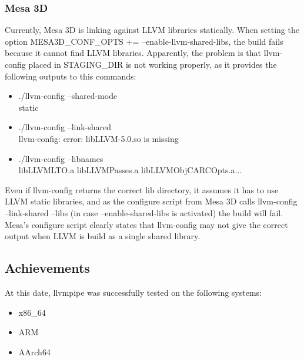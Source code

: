 \documentclass[12pt,a4paper,oneside]{article}
\begin{document}
\subsubsection*{Mesa 3D}
Currently, Mesa 3D is linking against LLVM libraries statically. When setting the
option {\selectfont MESA3D\_CONF\_OPTS += --enable-llvm-shared-libs},
the build fails because it cannot find LLVM libraries. Apparently, the problem is
that llvm-config placed in STAGING\_DIR is not working properly, as it provides
the following outputs to this commands:
\begin{itemize}
  \item {\selectfont./llvm-config --shared-mode\\
        static}
  \item {\selectfont./llvm-config --link-shared\\
        llvm-config: error: libLLVM-5.0.so is missing}

  \item {\selectfont./llvm-config --libnames\\
        libLLVMLTO.a libLLVMPasses.a libLLVMObjCARCOpts.a...}
\end{itemize}
Even if llvm-config returns the correct lib directory, it assumes it has to use
LLVM static libraries, and as the configure script from Mesa 3D calls llvm-config
--link-shared --libs (in case --enable-shared-libs is activated) the build
will fail. Mesa's configure script clearly states that llvm-config may not give
the correct output when LLVM is build as a single shared library.

\subsection*{Achievements}
At this date, llvmpipe was successfully tested on the following systems:
\begin{itemize}
  \item x86\_64
  \item ARM
  \item AArch64
\end{itemize}
\end{document}
